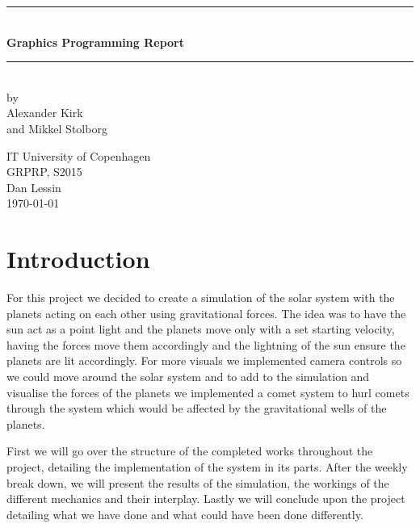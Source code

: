 \documentclass[a4paper,11pt]{article}
\begin{document}
\begin{titlepage}

\centering \parindent=0pt
\newcommand{\HRule}{\rule{\textwidth}{1mm}}
 \HRule\\[1cm]\Huge\bfseries
Graphics Programming Report\\[0.7cm]
\HRule\\[4cm]  
\large by 
\\Alexander Kirk
\\ and Mikkel Stolborg
 \normalsize %
\begin{flushleft}
IT University of Copenhagen \\
GRPRP, S2015\\
Dan Lessin\\
\today \end{flushleft}
\end{titlepage}

\tableofcontents
\pagebreak
\section{Introduction}
For this project we decided to create a simulation of the solar system with the planets acting on each other using gravitational forces. The idea was to have the sun act as a point light and the planets move only with a set starting velocity, having the forces move them accordingly and the lightning of the sun ensure the planets are lit accordingly.
For more visuals we implemented camera controls so we could move around the solar system and to add to the simulation and visualise the forces of the planets we implemented a comet system to hurl comets through the system which would be affected by the gravitational wells of the planets.

First we will go over the structure of the completed works throughout the project, detailing the implementation of the system in its parts. 
After the weekly break down, we will present the results of the simulation, the workings of the different mechanics and their interplay. 
Lastly we will conclude upon the project detailing what we have done and what could have been done differently.


 
\end{document}
